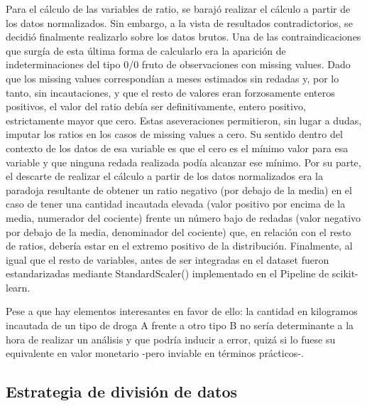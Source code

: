 \documentclass{article}
\begin{document}
		Para el cálculo de las variables de ratio, se barajó realizar el cálculo a partir de los datos normalizados. Sin embargo, a la vista de resultados contradictorios, se decidió finalmente realizarlo sobre los datos brutos. Una de las contraindicaciones que surgía de esta última forma de calcularlo era la aparición de indeterminaciones del tipo 0/0 fruto de observaciones con missing values. Dado que los missing values correspondían a meses estimados sin redadas y, por lo tanto, sin incautaciones, y que el resto de valores eran forzosamente enteros positivos, el valor del ratio debía ser definitivamente, entero positivo, estrictamente mayor que cero. Estas aseveraciones permitieron, sin lugar a dudas, imputar los ratios en los casos de missing values a cero. Su sentido dentro del contexto de los datos de esa variable es que el cero es el mínimo valor para esa variable y que ninguna redada realizada podía alcanzar ese mínimo. Por su parte, el descarte de realizar el cálculo a partir de los datos normalizados era la paradoja resultante de obtener un ratio negativo (por debajo de la media) en el caso de tener una cantidad incautada elevada (valor positivo por encima de la media, numerador del cociente) frente un número bajo de redadas (valor negativo por debajo de la media, denominador del cociente) que, en relación con el resto de ratios, debería estar en el extremo positivo de la distribución. Finalmente, al igual que el resto de variables, antes de ser integradas en el dataset fueron estandarizadas mediante StandardScaler() implementado en el Pipeline de scikit-learn.\
		
		
		
		
		Pese a que hay elementos interesantes en favor de ello: la cantidad en kilogramos incautada de un tipo de droga A frente a otro tipo B no sería determinante a la hora de realizar un análisis y que podría inducir a error, quizá si lo fuese su equivalente en valor monetario -pero inviable en términos prácticos-.\
		
	\subsection{Estrategia de división de datos}
	
\end{document}
